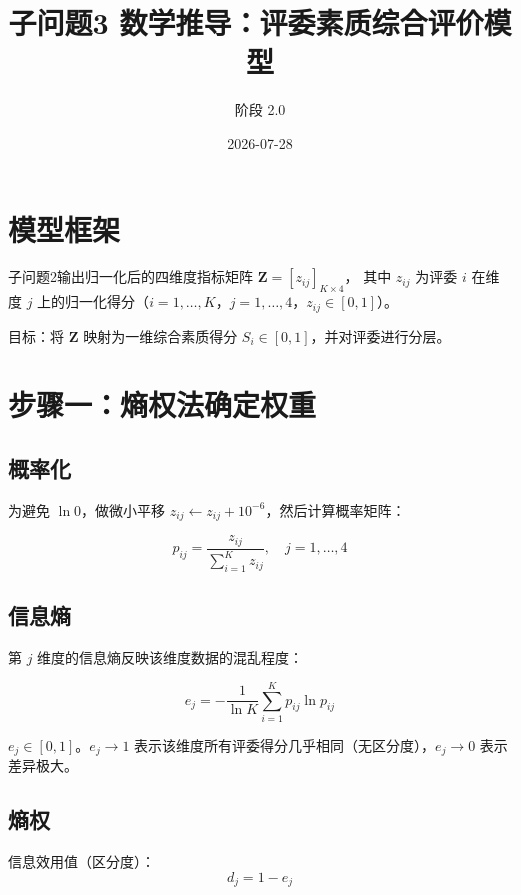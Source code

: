 \documentclass[UTF8]{ctexart}
\title{子问题3 数学推导：评委素质综合评价模型}
\author{阶段 2.0}
\date{2026-07-28}
\begin{document}
\maketitle

\section{模型框架}

子问题2输出归一化后的四维度指标矩阵 $\mathbf{Z} = [z_{ij}]_{K \times 4}$，
其中 $z_{ij}$ 为评委 $i$ 在维度 $j$ 上的归一化得分（$i=1,\ldots,K$，$j=1,\ldots,4$，$z_{ij} \in [0,1]$）。

目标：将 $\mathbf{Z}$ 映射为一维综合素质得分 $S_i \in [0,1]$，并对评委进行分层。

\section{步骤一：熵权法确定权重}

\subsection{概率化}

为避免 $\ln 0$，做微小平移 $z_{ij} \leftarrow z_{ij} + 10^{-6}$，然后计算概率矩阵：

\begin{equation}
p_{ij} = \frac{z_{ij}}{\sum_{i=1}^{K} z_{ij}}, \quad j = 1, \ldots, 4
\end{equation}

\subsection{信息熵}

第 $j$ 维度的信息熵反映该维度数据的混乱程度：

\begin{equation}
e_j = -\frac{1}{\ln K} \sum_{i=1}^{K} p_{ij} \ln p_{ij}
\end{equation}

$e_j \in [0, 1]$。$e_j \to 1$ 表示该维度所有评委得分几乎相同（无区分度），$e_j \to 0$ 表示差异极大。

\subsection{熵权}

信息效用值（区分度）：
\begin{equation}
d_j = 1 - e_j
\end{equation}
\end{document}
